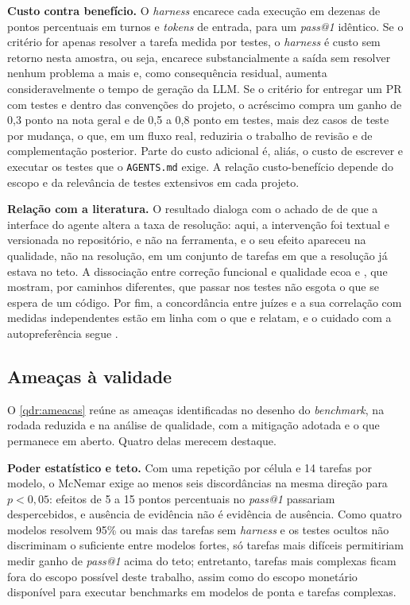 \textbf{Custo contra benefício.} O \textit{harness} encarece cada execução em
dezenas de pontos percentuais em turnos e \textit{tokens} de entrada, para um
\textit{pass@1} idêntico. Se o critério for apenas resolver a tarefa medida por
testes, o \textit{harness} é custo sem retorno nesta amostra, ou seja, encarece substancialmente a saída sem resolver nenhum problema a mais e, como consequência residual, aumenta consideravelmente o tempo de geração da LLM. Se o critério for entregar um PR com testes e dentro das convenções do projeto, o acréscimo
compra um ganho de 0,3 ponto na nota geral e de 0,5 a 0,8 ponto em testes, mais
dez casos de teste por mudança, o que, em um fluxo real, reduziria o trabalho
de revisão e de complementação posterior. Parte do custo adicional é, aliás, o
custo de escrever e executar os testes que o \texttt{AGENTS.md} exige. A
relação custo-benefício depende do escopo e da relevância de testes extensivos em cada projeto.

\textbf{Relação com a literatura.} O resultado dialoga com o achado de
 de que a interface do agente altera a taxa de
resolução: aqui, a intervenção foi textual e versionada no repositório, e não na
ferramenta, e o seu efeito apareceu na qualidade, não na resolução, em um
conjunto de tarefas em que a resolução já estava no teto. A dissociação entre
correção funcional e qualidade ecoa  e
, que mostram, por caminhos diferentes, que passar
nos testes não esgota o que se espera de um código. Por fim, a concordância
entre juízes e a sua correlação com medidas independentes estão em linha com
o que  e  relatam, e o
cuidado com a autopreferência segue .

\subsection{Ameaças à validade}
\label{sec:ameacas}

O \autoref{qdr:ameacas} reúne as ameaças identificadas no desenho do
\textit{benchmark}, na rodada reduzida e na análise de qualidade, com a
mitigação adotada e o que permanece em aberto. Quatro delas merecem destaque.

\textbf{Poder estatístico e teto.} Com uma repetição por célula e 14 tarefas
por modelo, o McNemar exige ao menos seis discordâncias na mesma direção para
$p < 0{,}05$: efeitos de 5 a 15 pontos percentuais no \textit{pass@1} passariam
despercebidos, e ausência de evidência não é evidência de ausência. Como quatro
modelos resolvem 95\% ou mais das tarefas sem \textit{harness} e os testes
ocultos não discriminam o suficiente entre modelos fortes, só tarefas mais difíceis
permitiriam medir ganho de \textit{pass@1} acima do teto; entretanto, tarefas mais complexas ficam fora do escopo possível deste trabalho, assim como do escopo monetário disponível para executar benchmarks em modelos de ponta e tarefas complexas.

